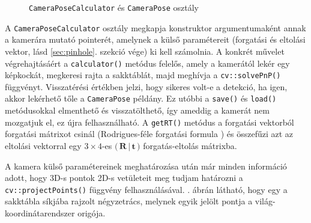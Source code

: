 \begin{figure}[tbh]
\centering


\caption{\texttt{CameraPoseCalculator} és \texttt{CameraPose} osztály \label{fig:cd:pose}}
\end{figure}

A \texttt{CameraPoseCalculator} osztály megkapja konstruktor argumentumaként annak a kamerára mutató pointerét, amelynek a külső paramétereit (forgatási és eltolási vektor, lásd \ref{sec:pinhole}. szekció vége) ki kell számolnia. A konkrét művelet végrehajtásáért a \texttt{calculator()} metódus felelős, amely a kamerától lekér egy képkockát, megkeresi rajta a sakktáblát, majd meghívja a \texttt{cv::solvePnP()} függvényt. Visszatérési értékben jelzi, hogy sikeres volt-e a detekció, ha igen, akkor lekérhető tőle a \texttt{CameraPose} példány. Ez utóbbi a \texttt{save()} és \texttt{load()} metódusokkal elmenthető és visszatölthető, így ameddig a kamerát nem mozgatjuk el, ez újra felhasználható. A \texttt{getRT()} metódus a forgatási vektorból forgatási mátrixot csinál (Rodrigues-féle forgatási formula \cite{camera-calib-3d}) és összefűzi azt az eltolási vektorral egy $3\times 4$-es $\Big(\,\mathbf{R}\,|\,\mathbf{t}\,\Big)$ forgatás-eltolás mátrixba.

A kamera külső paramétereinek meghatározása után már minden információ adott, hogy 3D-s pontok 2D-s vetületeit meg tudjam határozni a \texttt{cv::projectPoints()} függvény felhasználásával. . ábrán látható, hogy egy a sakktábla síkjába rajzolt négyzetrács, melynek egyik jelölt pontja a világ-koordinátarendszer origója.

